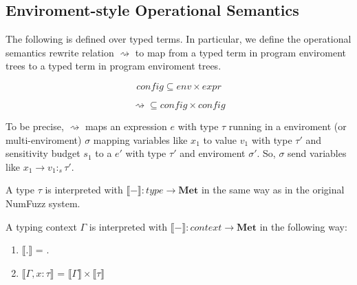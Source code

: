 \subsection{Enviroment-style Operational Semantics}
The following is defined over typed terms. In particular, we define the
operational semantics rewrite relation $\rightsquigarrow$ to map from a typed
term in program enviroment trees to a typed term in program enviroment trees. 

$$
\textit{config} \subseteq \textit{env} \times \textit{expr}
$$

$$
\rightsquigarrow \subseteq \textit{config} \times \textit{config}
$$

To be precise, $\rightsquigarrow$ maps an expression $e$ with type $\tau$
running in a enviroment (or multi-enviroment) $\sigma$ mapping variables like
$x_1$ to value $v_1$ with type $\tau'$ and sensitivity budget $s_1$ to a $e'$
with type $\tau'$ and enviroment $\sigma'$. So, $\sigma$ send variables like
$x_1 \to v_1 :_s \tau'$.

\begin{definition}
  A type $\tau$ is interpreted with $\llbracket - \rrbracket : \textit{type} \to
  \textbf{Met}$ in the same way as in the original NumFuzz system.
\end{definition}

\begin{definition}
  A typing context $\Gamma$ is interpreted with $\llbracket - \rrbracket :
  \textit{context} \to \textbf{Met}$ in the following way:
  \begin{enumerate}
    \item $\llbracket . \rrbracket$ = .
    \item $\llbracket \Gamma, x : \tau \rrbracket$ = $\llbracket \Gamma \rrbracket
      \times \llbracket \tau \rrbracket$
  \end{enumerate}
\end{definition}

